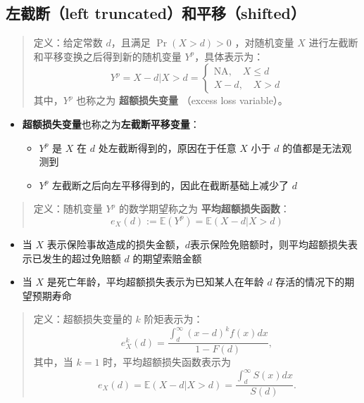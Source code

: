 \documentclass[
]{book}
\begin{document}
\hypertarget{ux5de6ux622aux65adleft-truncatedux548cux5e73ux79fbshifted}{%
\subsection{左截断（left truncated）和平移（shifted）}\label{ux5de6ux622aux65adleft-truncatedux548cux5e73ux79fbshifted}}

\begin{quote}
定义：给定常数 \(d\)，且满足 \(\Pr(X > d) > 0\) ，对随机变量 \(X\) 进行左截断和平移变换之后得到新的随机变量 \(Y^p\)，具体表示为：
\[
Y^p = X - d|X>d = \begin{cases}
\text{NA}, \quad X\le d \\
X - d, \quad X> d
\end{cases}
\]
其中，\(Y^p\) 也称之为 \textbf{超额损失变量} （excess loss variable）。
\end{quote}

\begin{itemize}
\item
  \textbf{超额损失变量}也称之为\textbf{左截断平移变量}：

  \begin{itemize}
  \item
    \(Y^p\) 是 \(X\) 在 \(d\) 处左截断得到的，原因在于任意 \(X\) 小于 \(d\) 的值都是无法观测到
  \item
    \(Y^p\) 左截断之后向左平移得到的，因此在截断基础上减少了 \(d\)
  \end{itemize}
\end{itemize}

\begin{quote}
定义：随机变量 \(Y^p\) 的数学期望称之为 \textbf{平均超额损失函数}：
\[
e_X(d):=\mathbb{E}(Y^p)=\mathbb{E}(X-d|X>d)
\]
\end{quote}

\begin{itemize}
\item
  当 \(X\) 表示保险事故造成的损失金额，\(d\)表示保险免赔额时，则平均超额损失表示已发生的超过免赔额 \(d\) 的期望索赔金额
\item
  当 \(X\) 是死亡年龄，平均超额损失表示为已知某人在年龄 \(d\) 存活的情况下的期望预期寿命
\end{itemize}

\begin{quote}
定义：超额损失变量的 \(k\) 阶矩表示为：
\[
e_{X}^k(d)
=\frac{\int_{d}^{\infty}(x-d)^kf(x)dx}{1-F(d)},
\]
其中，当 \(k=1\) 时，平均超额损失函数表示为
\[
{{e}_{X}}(d)=\mathbb{E}\left( X-d|X>d \right)=\frac{\int_{d}^{\infty }{{S}(x)dx}}{S(d)}.
\]
\end{quote}
\end{document}
